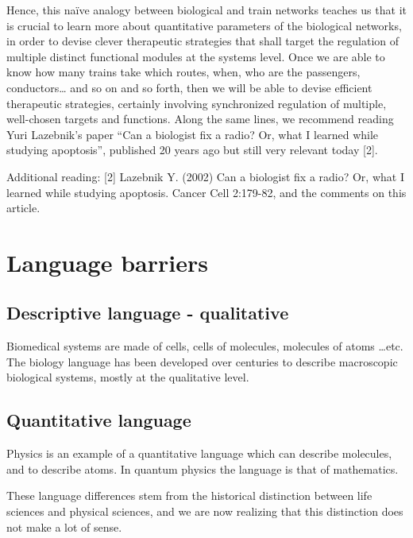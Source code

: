\documentclass[
]{book}
\begin{document}
Hence, this naïve analogy between biological and train networks teaches us that it is crucial to learn more about quantitative parameters of the biological networks, in order to devise clever therapeutic strategies that shall target the regulation of multiple distinct functional modules at the systems level. Once we are able to know how many trains take which routes, when, who are the passengers, conductors\ldots{} and so on and so forth, then we will be able to devise efficient therapeutic strategies, certainly involving synchronized regulation of multiple, well-chosen targets and functions. Along the same lines, we recommend reading Yuri Lazebnik's paper ``Can a biologist fix a radio? Or, what I learned while studying apoptosis'', published 20 years ago but still very relevant today {[}2{]}.

Additional reading:
{[}2{]} Lazebnik Y. (2002) Can a biologist fix a radio? Or, what I learned while studying apoptosis. Cancer Cell 2:179-82, and the comments on this article.

\hypertarget{language-barriers}{%
\chapter{Language barriers}\label{language-barriers}}

\hypertarget{descriptive-language---qualitative}{%
\section{Descriptive language - qualitative}\label{descriptive-language---qualitative}}

Biomedical systems are made of cells, cells of molecules, molecules of atoms \ldots etc. The biology language has been developed over centuries to describe macroscopic biological systems, mostly at the qualitative level.

\hypertarget{quantitative-language}{%
\section{Quantitative language}\label{quantitative-language}}

Physics is an example of a quantitative language which can describe molecules, and to describe atoms. In quantum physics the language is that of mathematics.

These language differences stem from the historical distinction between life sciences and physical sciences, and we are now realizing that this distinction does not make a lot of sense.
\end{document}
